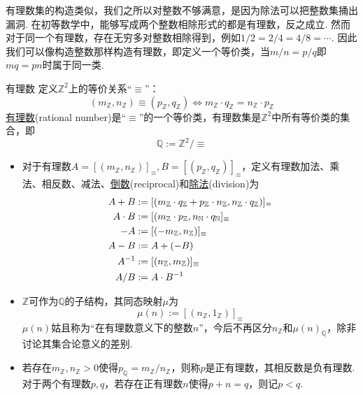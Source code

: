 有理数集的构造类似，我们之所以对整数不够满意，是因为除法可以把整数集捅出漏洞. 在初等数学中，能够写成两个整数相除形式的都是有理数，反之成立. 然而对于同一个有理数，存在无穷多对整数相除得到，例如\(1/2=2/4=4/8=\cdots\). 因此我们可以像构造整数那样构造有理数，即定义一个等价类，当\(m/n=p/q\)即\(mq=pn\)时属于同一类.

\begin{definition}{有理数}
    定义\(\mathbb{Z}^2\)上的等价关系“\(\equiv\)”：
    \[(m_{\mathbb{Z}},n_{\mathbb{Z}}) \equiv (p_{\mathbb{Z}},q_{\mathbb{Z}}) \Leftrightarrow m_{\mathbb{Z}} \cdot q_{\mathbb{Z}}=n_{\mathbb{Z}} \cdot p_{\mathbb{Z}}\]
    \underline{有理数}(rational number)是“\(\equiv\)”的一个等价类，有理数集是\(\mathbb{Z}^2\)中所有等价类的集合，即
    \[\mathbb{Q} := \mathbb{Z}^2/\equiv\]
    \begin{itemize}
        \item 对于有理数\(A = [(m_{\mathbb{Z}},n_{\mathbb{Z}})]_{\equiv}, B = [(p_{\mathbb{Z}},q_{\mathbb{Z}})]_{\equiv}\)，定义有理数加法、乘法、相反数、减法、\underline{倒数}(reciprocal)和\underline{除法}(division)为
        \[
            \begin{aligned}
                \relax A+B &:= [(m_{\mathbb{Z}} \cdot q_{\mathbb{Z}} + p_{\mathbb{Z}} \cdot n_{\mathbb{Z}},n_{\mathbb{Z}} \cdot q_{\mathbb{Z}})]_{\equiv}\\
                A \cdot B &:= [(m_{\mathbb{Z}} \cdot p_{\mathbb{Z}}, n_{\mathbb{N}} \cdot q_{\mathbb{N}}]_\equiv \\
                -A &:= [(-m_{\mathbb{Z}},n_{\mathbb{Z}})]_\equiv \\
                A - B &:= A + (-B) \\ 
                A^{-1} &:= [(n_{\mathbb{Z}},m_{\mathbb{Z}})]_\equiv \\
                A/B &:= A \cdot B^{-1}
            \end{aligned}
        \]
        \item \(\mathbb{Z}\)可作为\(\mathbb{Q}\)的子结构，其同态映射\(\mu\)为
        \[\mu(n) := [(n_{\mathbb{Z}},1_{\mathbb{Z}})]_{\equiv}\]
        \(\mu(n)\)姑且称为“在有理数意义下的整数\(n\)”，今后不再区分\(n_{\mathbb{Z}}\)和\(\mu(n)_{\mathbb{Q}}\)，除非讨论其集合论意义的差别.
        \item 若存在\(m_{\mathbb{Z}},n_{\mathbb{Z}}>0\)使得\(p_{\mathbb{Q}} = m_{\mathbb{Z}}/n_{\mathbb{Z}}\)，则称\(p\)是正有理数，其相反数是负有理数. 对于两个有理数\(p,q\)，若存在正有理数\(n\)使得\(p+n=q\)，则记\(p<q\).
        
    \end{itemize}
\end{definition}

